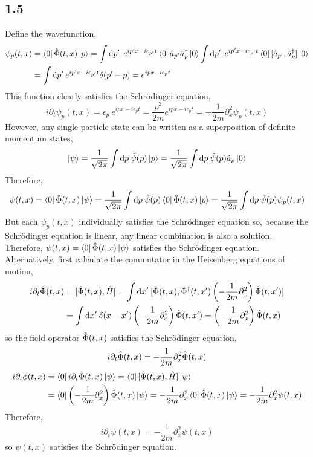 \documentclass[12pt]{extarticle}
\begin{document}
\subsection*{1.5}
Define the wavefunction,
\begin{align*}
\psi_p(t, x) & = \left< 0 \right| \hat{\Phi}(t, x) \left| p \right> = \int \mathrm{d}p' \: \: e^{i p' x - i \epsilon_{p'} t} \left< 0 \right| \hat{a}_{p'} \hat{a}^\dagger_p \left| 0 \right> \int \mathrm{d}p' \: \: e^{i p' x - i \epsilon_{p'} t} \left< 0 \right| [\hat{a}_{p'},  \hat{a}^\dagger_p] \left| 0 \right> 
\\
& = \int \mathrm{d}p' \:  e^{i p' x - i \epsilon_{p'} t} \delta(p' - p) = e^{i p x - i \epsilon_p t}
\end{align*}
This function clearly satisfies the Schrödinger equation, 
\[ i \partial_t \psi_p(t, x) = \epsilon_p \: e^{i p x - i \epsilon_p t} = \frac{p^2}{2m} e^{i p x - i \epsilon_p t} = - \frac{1}{2m} \partial_x^2 \psi_p(t, x)\]
However, any single particle state can be written as a superposition of definite momentum states,
\[ \left| \psi \right> = \frac{1}{\sqrt{2 \pi}} \int \mathrm{d}p \: \tilde{\psi}(p) \left| p \right> = \frac{1}{\sqrt{2 \pi}} \int \mathrm{d}p \: \tilde{\psi}(p) \hat{a}_p \left| 0 \right> \]
Therefore,
\[ \psi(t, x) = \left< 0 \right| \hat{\Phi}(t, x) \left| \psi \right> = \frac{1}{\sqrt{2 \pi}} \int \mathrm{d}p \: \tilde{\psi}(p) \left< 0 \right| \hat{\Phi}(t, x) \left| p \right> = \frac{1}{\sqrt{2 \pi}} \int \mathrm{d}p \: \tilde{\psi}(p) \psi_p(t, x) \]
But each $\psi_p(t, x)$ individually satisfies the Schrödinger equation so, because the Schrödinger equation is linear, any linear combination is also a solution. Therefore, $\psi(t, x) = \left< 0 \right| \hat{\Phi}(t, x) \left| \psi \right>$ satisfies the Schrödinger equation. \bigskip \\
Alternatively, first calculate the commutator in the Heisenberg equations of motion,
\begin{align*}
i \partial_t \hat{\Phi}(t, x) & = [\hat{\Phi}(t, x), \hat{H}] = \int \mathrm{d}x' \: [ \hat{\Phi}(t, x), \hat{\Phi}^\dagger(t, x') \left( - \frac{1}{2m} \partial_{x}^2 \right) \hat{\Phi}(t, x')]
\\
& = \int \mathrm{d}x' \: \delta(x - x') \left( - \frac{1}{2m} \partial_{x}^2 \right) \hat{\Phi}(t, x') = \left( - \frac{1}{2m} \partial_{x}^2 \right) \hat{\Phi}(t, x)
\end{align*} 
so the field operator $\hat{\Phi}(t, x)$ satisfies the Schrödinger equation,
\[ i \partial_t \hat{\Phi}(t, x) = - \frac{1}{2m} \partial_{x}^2 \hat{\Phi}(t, x)\]
\begin{align*}
i \partial_t \phi(t, x) & = \left< 0 \right| i \partial_t \hat{\Phi}(t, x) \left| \psi \right> = \left< 0 \right| [\hat{\Phi}(t, x), \hat{H}] \left| \psi \right>
\\
& = \left< 0 \right| \left( - \frac{1}{2m} \partial_{x}^2 \right) \hat{\Phi}(t, x) \left| \psi \right> 
= - \frac{1}{2m} \partial_x^2 \left< 0 \right| \hat{\Phi}(t, x) \left| \psi \right> = - \frac{1}{2m} \partial_x^2 \psi(t, x)
\end{align*} 
Therefore,
\[ i \partial_t \psi(t, x) = - \frac{1}{2m} \partial_x^2 \psi(t, x)\]
so $\psi(t, x)$ satisfies the Schrödinger equation. 
\end{document}
